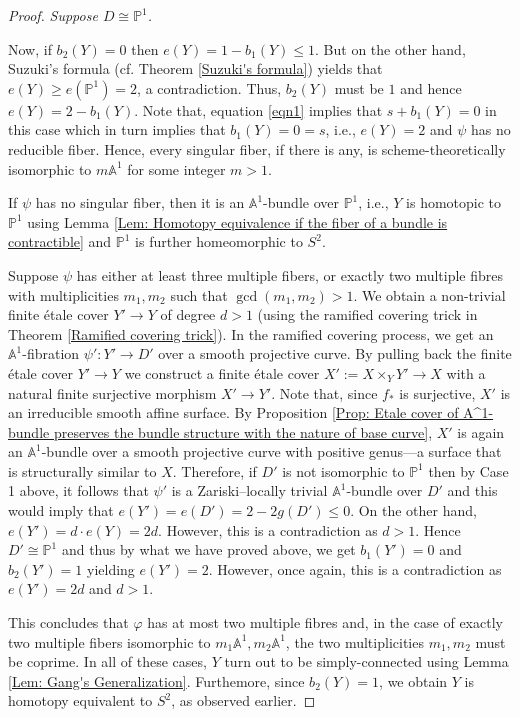 \documentclass[12pt,reqno,twoside]{amsart}
\theoremstyle{definition}
\numberwithin{equation}{section}
\newcommand{\A}{\mathbb{A}}
\newcommand{\PP}{\mathbb{P}}
\begin{document}
\begin{proof}
    \medskip
     \emph{Suppose $D\cong \PP^1$.}

    \medskip
    \noindent
    Now, if $b_2(Y)=0$ then $e(Y)=1-b_1(Y)\leq 1$. But on the other hand, Suzuki's formula (cf. Theorem \ref{Suzuki's formula}) yields that $e(Y)\geq e(\PP^1)=2$, a contradiction. Thus, $b_2(Y)$ must be $1$ and hence $e(Y)=2-b_1(Y)$. Note that, equation \eqref{eqn1} implies that $s+b_1(Y)=0$ in this case which in turn implies that $b_1(Y)=0=s$, i.e., $e(Y)=2$ and $\psi$ has no reducible fiber. Hence, every singular fiber, if there is any, is scheme-theoretically isomorphic to $m\A^1$ for some integer $m>1$.  
    
    \medskip
    If $\psi$ has no singular fiber, then it is an $\A^1$-bundle over $\PP^1$, i.e., $Y$ is homotopic to $\PP^1$ using Lemma \ref{Lem: Homotopy equivalence if the fiber of a bundle is contractible} and $\PP^1$ is further homeomorphic to $S^2$.

    \medskip
    Suppose $\psi$ has either at least three multiple fibers, or exactly two multiple fibres with multiplicities $m_1, m_2$ such that $\gcd(m_1,m_2)>1$. We obtain a non-trivial finite {\'e}tale cover $Y'\to Y$ of degree $d>1$ (using the ramified covering trick in Theorem \ref{Ramified covering trick}). In the ramified covering process, we get an $\A^1$-fibration $\psi':Y'\to D'$ over a smooth projective curve. By pulling back the finite {\'e}tale cover $Y'\to Y$ we construct a finite {\'e}tale cover $X':=X\times_{Y}Y' \to X$ with a natural finite surjective morphism $X' \to Y'$. Note that, since $f_\ast$ is surjective, $X'$ is an irreducible smooth affine surface. By Proposition \ref{Prop: Etale cover of A^1-bundle preserves the bundle structure with the nature of base curve}, $X'$ is again an $\A^1$-bundle over a smooth projective curve with positive genus---a surface that is structurally similar to $X$. Therefore, if $D'$ is not isomorphic to $\PP^1$ then by Case 1 above, it follows that $\psi'$ is a Zariski--locally trivial $\A^1$-bundle over $D'$ and this would imply that $e(Y')=e(D')=2 - 2g(D')\leq 0$. On the other hand, $e(Y') = d \cdot e(Y) = 2d$. However, this is a contradiction as $d>1$. Hence $D'\cong \PP^1$ and thus by what we have proved above, we get $b_1(Y')=0$ and $b_2(Y')=1$ yielding $e(Y')=2$. However, once again, this is a contradiction as $e(Y')=2d$ and $d>1$.

    \medskip
    This concludes that $\varphi$ has at most two multiple fibres and, in the case of exactly two multiple fibers isomorphic to $m_1\A^1, m_2\A^1$, the two multiplicities $m_1,m_2$ must be coprime. In all of these cases, $Y$ turn out to be simply-connected using Lemma \ref{Lem: Gang's Generalization}. Furthemore, since $b_2(Y)=1$, we obtain $Y$ is homotopy equivalent to $S^2$, as observed earlier.


\end{proof}
\end{document}
